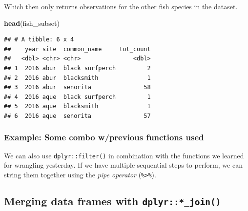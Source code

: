 \documentclass[]{book}
\newenvironment{Shaded}{\begin{snugshade}}{\end{snugshade}}
\newcommand{\KeywordTok}[1]{\textcolor[rgb]{0.13,0.29,0.53}{\textbf{#1}}}
\newcommand{\NormalTok}[1]{#1}
\newcommand{\OperatorTok}[1]{\textcolor[rgb]{0.81,0.36,0.00}{\textbf{#1}}}
\newcommand{\StringTok}[1]{\textcolor[rgb]{0.31,0.60,0.02}{#1}}
\begin{document}
\begin{Shaded}
\end{Shaded}

Which then only returns observations for the other fish species in the dataset.

\begin{Shaded}
\begin{Highlighting}[]
\KeywordTok{head}\NormalTok{(fish_subset)}
\end{Highlighting}
\end{Shaded}

\begin{verbatim}
## # A tibble: 6 x 4
##    year site  common_name     tot_count
##   <dbl> <chr> <chr>               <dbl>
## 1  2016 abur  black surfperch         2
## 2  2016 abur  blacksmith              1
## 3  2016 abur  senorita               58
## 4  2016 aque  black surfperch         1
## 5  2016 aque  blacksmith              1
## 6  2016 aque  senorita               57
\end{verbatim}

\hypertarget{example-some-combo-wprevious-functions-used}{%
\subsubsection{Example: Some combo w/previous functions used}\label{example-some-combo-wprevious-functions-used}}

We can also use \texttt{dplyr::filter()} in combination with the functions we learned for wrangling yesterday. If we have multiple sequential steps to perform, we can string them together using the \emph{pipe operator} (\texttt{\%\textgreater{}\%}).

\hypertarget{merging-data-frames-with-dplyr_join}{%
\subsection{\texorpdfstring{Merging data frames with \texttt{dplyr::*\_join()}}{Merging data frames with dplyr::*\_join()}}\label{merging-data-frames-with-dplyr_join}}
\end{document}
